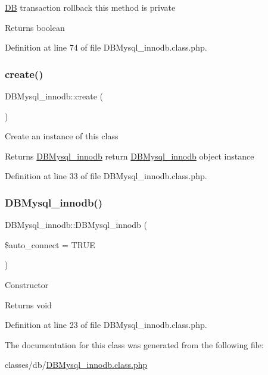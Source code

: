 \hyperlink{classDB}{DB} transaction rollback this method is private \begin{DoxyReturn}{Returns}
boolean 
\end{DoxyReturn}


Definition at line 74 of file D\+B\+Mysql\+\_\+innodb.\+class.\+php.

\hypertarget{classDBMysql__innodb_ac00d0e52855fb50fc453dd78367de102}{}\label{classDBMysql__innodb_ac00d0e52855fb50fc453dd78367de102} 
\subsubsection{\texorpdfstring{create()}{create()}}
{\footnotesize\ttfamily D\+B\+Mysql\+\_\+innodb\+::create (\begin{DoxyParamCaption}{ }\end{DoxyParamCaption})}

Create an instance of this class \begin{DoxyReturn}{Returns}
\hyperlink{classDBMysql__innodb}{D\+B\+Mysql\+\_\+innodb} return \hyperlink{classDBMysql__innodb}{D\+B\+Mysql\+\_\+innodb} object instance 
\end{DoxyReturn}


Definition at line 33 of file D\+B\+Mysql\+\_\+innodb.\+class.\+php.

\hypertarget{classDBMysql__innodb_a427178f2ed07dbec683c2de9d0be925d}{}\label{classDBMysql__innodb_a427178f2ed07dbec683c2de9d0be925d} 
\subsubsection{\texorpdfstring{D\+B\+Mysql\+\_\+innodb()}{DBMysql\_innodb()}}
{\footnotesize\ttfamily D\+B\+Mysql\+\_\+innodb\+::\+D\+B\+Mysql\+\_\+innodb (\begin{DoxyParamCaption}\item[{}]{\$auto\+\_\+connect = {\ttfamily TRUE} }\end{DoxyParamCaption})}

Constructor \begin{DoxyReturn}{Returns}
void 
\end{DoxyReturn}


Definition at line 23 of file D\+B\+Mysql\+\_\+innodb.\+class.\+php.



The documentation for this class was generated from the following file\+:\begin{DoxyCompactItemize}
\item 
classes/db/\hyperlink{DBMysql__innodb_8class_8php}{D\+B\+Mysql\+\_\+innodb.\+class.\+php}\end{DoxyCompactItemize}
